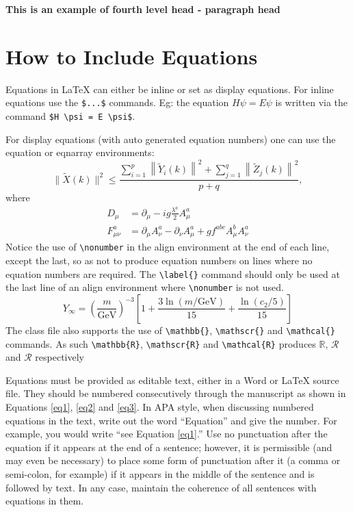 \documentclass[12pt,a4paper]{article}
\newcommand{\subsubsubsection}[1]{%
  \vspace{\baselineskip}%
  \noindent\textbf{#1\\}\quad%
}
\begin{document}
\subsubsubsection{This is an example of fourth level head - paragraph head}
\lipsum[9]


\section{How to Include Equations}\label{sec4}

Equations in \LaTeX{} can either be inline or set as display equations. For
inline equations use the \verb+$...$+ commands. Eg: the equation
$H\psi = E \psi$ is written via the command \verb+$H \psi = E \psi$+.

For display equations (with auto generated equation numbers)
one can use the equation or eqnarray environments:
\begin{equation}
\|\tilde{X}(k)\|^2 \leq\frac{\sum\limits_{i=1}^{p}\left\|\tilde{Y}_i(k)\right\|^2+\sum\limits_{j=1}^{q}\left\|\tilde{Z}_j(k)\right\|^2 }{p+q},
\label{eq1}
\end{equation}
where
\begin{align}
D_\mu &=  \partial_\mu - ig \frac{\lambda^a}{2} A^a_\mu \nonumber \\
F^a_{\mu\nu} &= \partial_\mu A^a_\nu - \partial_\nu A^a_\mu + g f^{abc} A^b_\mu A^a_\nu
\label{eq2}
\end{align}
Notice the use of \verb+\nonumber+ in the align environment at the end
of each line, except the last, so as not to produce equation numbers on
lines where no equation numbers are required. The \verb+\label{}+ command
should only be used at the last line of an align environment where
\verb+\nonumber+ is not used.
\begin{equation}
Y_\infty = \left( \frac{m}{\textrm{GeV}} \right)^{-3}
    \left[ 1 + \frac{3 \ln(m/\textrm{GeV})}{15}
    + \frac{\ln(c_2/5)}{15} \right]
\label{eq3}
\end{equation}
The class file also supports the use of \verb+\mathbb{}+, \verb+\mathscr{}+ and
\verb+\mathcal{}+ commands. As such \verb+\mathbb{R}+, \verb+\mathscr{R}+
and \verb+\mathcal{R}+ produces $\mathbb{R}$, $\mathscr{R}$ and $\mathcal{R}$
respectively 

Equations must be provided as editable text, either in a Word or LaTeX source file. They should be numbered consecutively through the manuscript as shown in Equations \ref{eq1}, \ref{eq2} and \ref{eq3}. In APA style, when discussing numbered equations in the text, write out the word “Equation” and give the number. For example, you would write “see Equation \ref{eq1}.”
Use no punctuation after the equation if it appears at the end of a sentence; however, it is permissible (and may even be necessary) to place some form of punctuation after it (a comma or semi-colon, for example) if it appears in the middle of the sentence and is followed by text. In any case, maintain the coherence of all sentences with equations in them.
\end{document}
